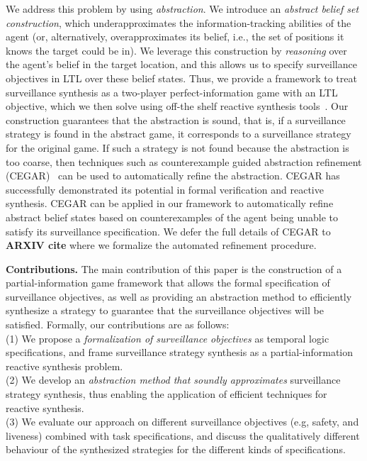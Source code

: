 We address this problem by using \emph{abstraction}. We introduce an \emph{abstract belief set construction}, which underapproximates the information-tracking abilities of the agent (or, alternatively, overapproximates its belief, i.e., the set of positions it knows the target could be in). We leverage this construction by \emph{reasoning} over the agent's belief in the target location, and this allows us to specify surveillance objectives in LTL over these belief states. Thus, we provide a framework to treat surveillance synthesis as a two-player perfect-information game with an LTL objective, which we then solve using off-the shelf reactive synthesis tools~\cite{EhlersR16}. Our construction guarantees that the abstraction is sound, that is, if a surveillance strategy is found in the abstract game, it corresponds to a surveillance strategy for the original game. If such a strategy is not found because the abstraction is too coarse, then techniques such as counterexample guided abstraction refinement (CEGAR)~\cite{ClarkeGJLV00} can be used to automatically refine the abstraction. CEGAR has successfully demonstrated its potential in formal verification and reactive synthesis. CEGAR can be applied in our framework to automatically refine abstract belief states based on counterexamples of the agent being unable to satisfy its surveillance specification. We defer the full details of CEGAR to \textbf{ARXIV cite} where we formalize the automated refinement procedure.


{\bf Contributions.} The main contribution of this paper is the construction of a partial-information game framework that allows the formal specification of surveillance objectives, as well as providing an abstraction method to efficiently synthesize a strategy to guarantee that the surveillance objectives will be satisfied. Formally, our contributions are as follows:\\
(1) We propose a \emph{formalization of surveillance objectives} as temporal logic specifications, and frame surveillance strategy synthesis  as a partial-information reactive synthesis problem.\\
(2) We develop an \emph{abstraction method that soundly approximates} surveillance strategy synthesis, thus enabling the application of efficient techniques for reactive synthesis.\\
(3) We evaluate our approach on different surveillance objectives (e.g, safety, and liveness) combined with task specifications, and discuss the qualitatively different behaviour of the synthesized strategies for the different kinds of specifications.

